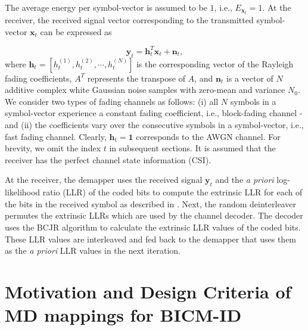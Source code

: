 \documentclass[12pt, draftclsnofoot, onecolumn]{IEEEtran}
\newcommand{\mb}[1]{\boldsymbol{#1}}
\begin{document}
 The average energy per symbol-vector is assumed to be $1$, i.e., $E_{\mb{x}_{t}}=1$.  %
  At the receiver, the received signal vector corresponding to the transmitted symbol-vector  $\mb{x}_t$ can be expressed as 

\begin{equation}
{\mb y}_t = \mb{h}^{T}_t{\mb x}_t + {\mb n}_t,
\end{equation}where ${\mb h}_t = [h_{t}^{(1)}, h_{t}^{(2)}, \cdots, h_{t}^{(N)}]$ is the corresponding vector of the Rayleigh fading coefficients, $A^{T}$ represents the transpose of $A$, \color{black}  and ${\mb n}_t$ is a vector of $N$ additive complex white Gaussian noise samples with zero-mean and variance $N_0$. We consider two types  of fading channels as follows: (i) all $N$ symbols in a symbol-vector experience a constant fading coefficient, i.e.,   block-fading   channel \cite{Block-Fading1}-\cite{Block-Fading2} \color{black}and  (ii) the coefficients vary over the consecutive symbols in a symbol-vector, i.e., fast fading channel.  Clearly, $\mb{h}_t=\mb{1}$ corresponds to the AWGN channel. For brevity, we omit the index $t$ in subsequent  sections.   It is assumed that the receiver
has the perfect channel state information (CSI).

At the receiver, the demapper uses the received signal $\mb{y}_{t}$ and the \textit{a priori} log-likelihood ratio (LLR) of the coded bits to compute the extrinsic LLR for each of the bits in the received symbol as described in \cite{Brink}. Next, the random deinterleaver permutes the extrinsic LLRs which are used by  the channel decoder. The decoder  uses the BCJR algorithm \cite{BCJR} to calculate the extrinsic LLR values of  the coded bits. These LLR values are interleaved and fed back to the demapper that uses  them as the \textit{a priori} LLR values in the next iteration. \color{black}



\section{Motivation and Design Criteria of MD mappings for BICM-ID}
\label{Guide-Lines}
\end{document}
